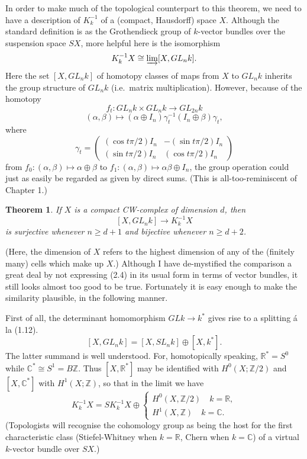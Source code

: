 \documentclass[openany,leqno]{book}  %
\newcommand{\Z}{\mathbb{Z}}
\newcommand{\R}{\mathbb{R}}
\newtheorem{theorem}{Theorem}[chapter]
\begin{document}
In order to make much of the topological counterpart to this theorem, we need to have a description of $K_k^{-1}$ of a (compact, Hausdorff) space $X$. Although the standard definition is as the Grothendieck group of $k$-vector bundles over the suspension space $SX$, more helpful here is the isomorphism
\[K_k^{-1} X   \cong \varinjlim [X, GL_n k].\]
Here the set $[X, GL_n k]$ of homotopy  classes of  maps from $X$ to $GL_n k$ inherits the group structure 
of $GL_n k$ (i.e.\  matrix multiplication).  However, because of the homotopy
\[f_t \colon   GL_n k \times  GL_n k\longrightarrow GL_{2n}k\]
\[(\alpha,\beta)\mapsto (\alpha \oplus I_n)\gamma_t^{-1} (I_n\oplus \beta)\gamma_t,\]
where
\begin{equation*}
  \gamma_t =\begin{pmatrix} (\cos t\pi/2)I_n & -(\sin t\pi/2)I_n \\ (\sin t\pi/2)I_n &  (\cos t\pi/2)I_n \end{pmatrix}
\end{equation*}
from $f_0\colon   (\alpha,\beta) \mapsto \alpha\oplus \beta$ to $f_1\colon   (\alpha,\beta)  \mapsto \alpha \beta \oplus I_n$, the group  operation could just as easily be regarded as given by direct sums. (This is all-too-reminiscent of Chapter 1.)
\begin{theorem}
If $X$ is a compact CW-complex of  dimension $d$, then
 \[[X,GL_n k] \longrightarrow  K_k^{-1}X\]
is surjective whenever  $n \geqslant d + 1 $ and bijective whenever $ n \geqslant d+ 2$.
\end{theorem}
(Here, the dimension of  $X$ refers to the highest dimension of any of the (finitely many) cells which make up $X$.) Although I have de-mystified the comparison a great deal by not expressing (2.4) in its usual form in terms of vector bundles, it still looks almost too good to be true. 
Fortunately it is easy enough to make the similarity plausible, in the following manner.

First of all, the determinant homomorphism  $GLk\longrightarrow k^*$ gives rise to a splitting \'{a} la (1.12).
$$[X ,  GL_n k]  =  [ X,SL_n k]\oplus [X,k^*].$$
The latter summand is well understood. For, homotopically speaking, $\R^*=S^0$ while $\mathbb{C}^*\cong S^1=B\Z$. Thus $[X,\R^*]$ may be identified with $H^0(X;\Z /2)$ and $[X,\mathbb{C}^*]$ with $H^1(X;\Z)$, so that in the limit we have
\begin{equation}
K_k^{-1}X=SK_k^{-1}X \oplus
  \begin{cases}
H^0(X,\Z/2) \quad k=\R, \\
H^1(X,\Z) \quad k=\mathbb{C}.
\end{cases}
\end{equation}
(Topologists will recognise the cohomology group as being the host for the first characteristic class (Stiefel-Whitney when $k=\R$, Chern when $k=\mathbb{C}$) of a virtual $k$-vector bundle over $SX$.)
\end{document}
